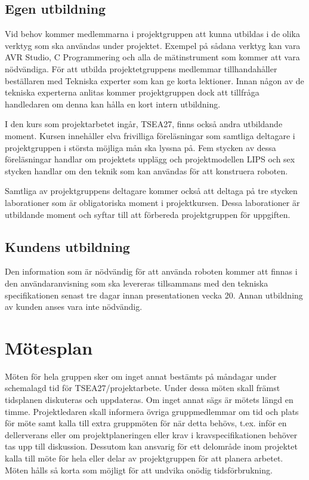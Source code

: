 \documentclass[a4paper,12pt]{article}
\begin{document}
\subsection{Egen utbildning}
Vid behov kommer medlemmarna i projektgruppen att kunna utbildas i de olika verktyg som ska användas under projektet. Exempel på sådana verktyg kan vara AVR Studio, C Programmering och alla de mätinstrument som kommer att vara nödvändiga. För att utbilda projektetgruppens medlemmar tillhandahåller beställaren med Tekniska experter som kan ge korta lektioner. Innan någon av de tekniska experterna anlitas kommer projektgruppen dock att tillfråga handledaren om denna kan hålla en kort intern utbildning. 

I den kurs som projektarbetet ingår, TSEA27, finns också andra utbildande moment. Kursen innehåller elva frivilliga föreläsningar som samtliga deltagare i projektgruppen i största möjliga mån ska lyssna på. Fem stycken av dessa föreläsningar handlar om projektets upplägg och projektmodellen LIPS och sex stycken handlar om den teknik som kan användas för att konstruera roboten.

Samtliga av projektgruppens deltagare kommer också att deltaga på tre stycken laborationer som är obligatoriska moment i projektkursen. Dessa laborationer är utbildande moment och syftar till att förbereda projektgruppen för uppgiften.


\subsection{Kundens utbildning}
Den information som är nödvändig för att använda roboten kommer att finnas i den användaranvisning som ska levereras tillsammans med den tekniska specifikationen senast tre dagar innan presentationen vecka 20. Annan utbildning av kunden anses vara inte nödvändig.


\section{Mötesplan}
Möten för hela gruppen sker om inget annat bestämts på måndagar under schemalagd tid för TSEA27/projektarbete. Under dessa möten skall främst tidsplanen diskuteras och uppdateras. Om inget annat sägs är mötets längd en timme.
Projektledaren skall informera övriga gruppmedlemmar om tid och plats för möte samt kalla till extra gruppmöten för när detta behövs, t.ex. inför en dellerverans eller om projektplaneringen eller krav i kravspecifikationen behöver tas upp till diskussion. Dessutom kan ansvarig för ett delområde inom projektet kalla till möte för hela eller delar av projektgruppen för att planera arbetet. Möten hålls så korta som möjligt för att undvika onödig tidsförbrukning.
\end{document}

